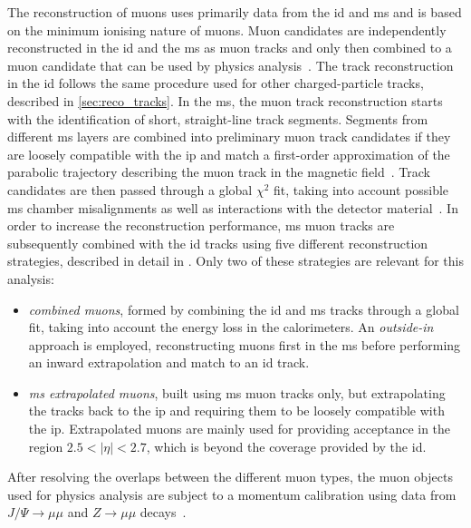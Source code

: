 The reconstruction of muons uses primarily data from the \gls{id} and \gls{ms} and is based on the minimum ionising nature of muons. Muon candidates are independently reconstructed in the \gls{id} and the \gls{ms} as muon tracks and only then combined  to a muon candidate that can be used by physics analysis~\cite{PERF-2015-10,Aad:2020gmm}. The track reconstruction in the \gls{id} follows the same procedure used for other charged-particle tracks, described in \cref{sec:reco_tracks}. In the \gls{ms}, the muon track reconstruction starts with the identification of short, straight-line track segments. Segments from different \gls{ms} layers are combined into preliminary muon track candidates if they are loosely compatible with the \gls{ip} and match a first-order approximation of the parabolic trajectory describing the muon track in the magnetic field~\cite{Aad:2020gmm}. Track candidates are then passed through a global $\chi^2$ fit, taking into account possible \gls{ms} chamber misalignments as well as interactions with the detector material~\cite{Aad:2020gmm}. In order to increase the reconstruction performance, \gls{ms} muon tracks are subsequently combined with the \gls{id} tracks using five different reconstruction strategies, described in detail in \cite{Aad:2020gmm}. Only two of these strategies are relevant for this analysis:
\begin{itemize}
	\item \textit{combined muons}, formed by combining the \gls{id} and \gls{ms} tracks through a global fit, taking into account the energy loss in the calorimeters. An \textit{outside-in} approach is employed, reconstructing muons first in the \gls{ms} before performing an inward extrapolation and match to an \gls{id} track.
	\item \textit{\gls{ms} extrapolated muons}, built using \gls{ms} muon tracks only, but extrapolating the tracks back to the \gls{ip} and requiring them to be loosely compatible with the \gls{ip}. Extrapolated muons are mainly used for providing acceptance in the region $2.5 < \vert\eta\vert < 2.7$, which is beyond the coverage provided by the \gls{id}.
\end{itemize}
After resolving the overlaps between the different muon types, the muon objects used for physics analysis are subject to a momentum calibration using data from $J/\Psi\rightarrow\mu\mu$ and $Z\rightarrow\mu\mu$ decays~\cite{Aad:2020gmm}.

